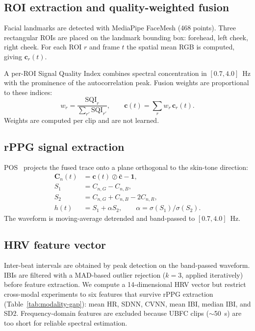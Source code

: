 \documentclass[conference]{IEEEtran}
\begin{document}
\subsection{ROI extraction and quality-weighted fusion}
Facial landmarks are detected with MediaPipe FaceMesh (468 points).
Three rectangular ROIs are placed on the landmark bounding box:
forehead, left cheek, right cheek. For each ROI $r$ and frame $t$ the
spatial mean RGB is computed, giving $\mathbf{c}_r(t)$.

A per-ROI Signal Quality Index combines spectral concentration in
$[0.7,4.0]$~Hz with the prominence of the autocorrelation peak. Fusion
weights are proportional to these indices:
\begin{equation}
w_r = \frac{\mathrm{SQI}_r}{\sum_{r'} \mathrm{SQI}_{r'}}, \qquad
\mathbf{c}(t) = \sum_r w_r \, \mathbf{c}_r(t).
\end{equation}
Weights are computed per clip and are not learned.

\subsection{rPPG signal extraction}
POS~\cite{wang2017} projects the fused trace onto a plane orthogonal
to the skin-tone direction:
\begin{align}
\mathbf{C}_n(t) &= \mathbf{c}(t) \oslash \bar{\mathbf{c}} - \mathbf{1}, \\
S_1 &= C_{n,G} - C_{n,B}, \\
S_2 &= C_{n,G} + C_{n,B} - 2C_{n,R}, \\
h(t) &= S_1 + \alpha S_2, \qquad \alpha = \sigma(S_1)/\sigma(S_2).
\end{align}
The waveform is moving-average detrended and band-passed to
$[0.7,4.0]$~Hz.

\subsection{HRV feature vector}
Inter-beat intervals are obtained by peak detection on the band-passed
waveform. IBIs are filtered with a MAD-based outlier rejection
($k{=}3$, applied iteratively) before feature extraction. We compute a
14-dimensional HRV vector but restrict cross-modal experiments to six
features that survive rPPG extraction (Table~\ref{tab:modality-gap}):
mean HR, SDNN, CVNN, mean IBI, median IBI, and SD2. Frequency-domain
features are excluded because UBFC clips ($\sim$50~s) are too short
for reliable spectral estimation.
\end{document}
